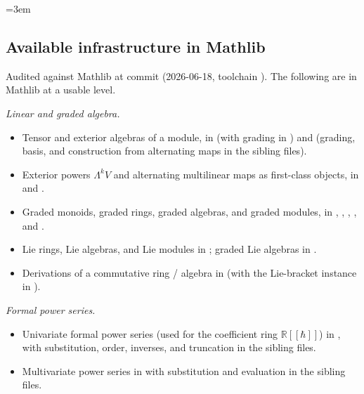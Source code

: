 \documentclass[11pt,a4paper]{article}
\theoremstyle{definition}
\newcommand{\R}{\mathbb{R}}
\begin{document}
\begingroup
\emergencystretch=3em

\subsection{Available infrastructure in Mathlib}\label{ssec:available}

Audited against Mathlib at commit  (2026-06-18,
toolchain ). The following are in
Mathlib at a usable level.

\emph{Linear and graded algebra.}
\begin{itemize}[leftmargin=2em]
  \item Tensor and exterior algebras of a module, in
        (with grading in ) and
        (grading, basis, and construction from alternating maps in
        the sibling files).
  \item Exterior powers $\Lambda^{k} V$ and alternating multilinear
        maps as first-class objects, in
         and
        .
  \item Graded monoids, graded rings, graded algebras, and graded
        modules, in ,
        ,
        ,
        ,
        and .
  \item Lie rings, Lie algebras, and Lie modules in
        ; graded Lie algebras in
        .
  \item Derivations of a commutative ring / algebra in
        (with the Lie-bracket instance in
        ).
\end{itemize}

\emph{Formal power series.}
\begin{itemize}[leftmargin=2em]
  \item Univariate formal power series (used for the coefficient ring
        $\R[[\hbar]]$) in ,
        with substitution, order, inverses, and truncation in the
        sibling files.
  \item Multivariate power series in
        with substitution and evaluation in the sibling files.
\end{itemize}
\end{document}
